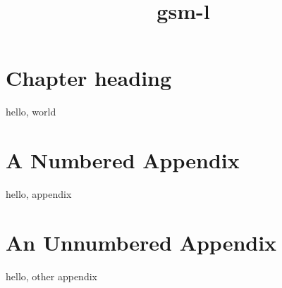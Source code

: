 \documentclass{gsm-l}
\title{gsm-l}
\begin{document}
\maketitle

\chapter{Chapter heading}

hello, world

\appendix


\chapter{A Numbered Appendix}


hello, appendix

\chapter*{An Unnumbered Appendix}

hello, other appendix
\end{document}
